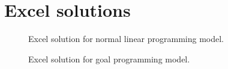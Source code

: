 \documentclass[a4paper,oneside,11pt]{book}
\begin{document}
\section{Excel solutions}
\begin{figure}[H]
    \centering
    \caption{Excel solution for normal linear programming model.}
\end{figure}
\begin{figure}[H]
    \centering
    \caption{Excel solution for goal programming model.}
\end{figure}
\end{document}
